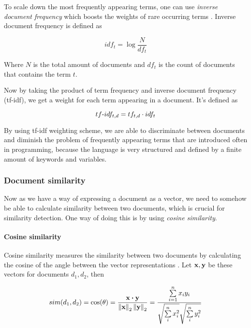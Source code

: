 To scale down the most frequently appearing terms, one can use \emph{inverse document frequency} which boosts the weights of rare occurring terms \cite{Manning:2008:IIR:1394399}. Inverse document frequency is defined as

\begin{equation}
    idf_t = \log \dfrac{N}{df_t}
\end{equation}

\noindent
Where $N$ is the total amount of documents and $df_{t}$ is the count of documents that contains the term $t$.

Now by taking the product of term frequency and inverse document frequency (tf-idf), we get a weight for each term appearing in a document. It's defined as

\begin{equation}
    tf{\text -}idf_{t, d} = tf_{t, d} \cdot idf_{t}
\end{equation}

By using tf-idf weighting scheme, we are able to discriminate between documents and diminish the problem of frequently appearing terms that are introduced often in programming, because the language is very structured and defined by a finite amount of keywords and variables. 

\subsubsection{Document similarity}

Now as we have a way of expressing a document as a vector, we need to somehow be able to calculate similarity between two documents, which is crucial for similarity detection. One way of doing this is by using \emph{cosine similarity}.

\paragraph{Cosine similarity}

Cosine similarity measures the similarity between two documents by calculating the cosine of the angle between the vector representations \cite{Manning:2008:IIR:1394399}. Let $\mathbf{x}, \mathbf{y}$ be these vectors for documents $d_1, d_2$, then

\begin{equation} \label{eq-cosine-orig}
    sim(d_1, d_2) = \cos(\theta) = \dfrac{\mathbf{x} \boldsymbol{\cdot} \mathbf{y}}
                          {\left\lVert\mathbf{x}\right\rVert_2 \left\lVert\mathbf{y}\right\rVert_2} = 
                          \dfrac{\sum \limits_{i=1}^n x_i y_i}
                                {\sqrt{\sum \limits_{i}^n {x}_i^2} \sqrt{\sum \limits_{i}^n y_i^2}}
\end{equation}

